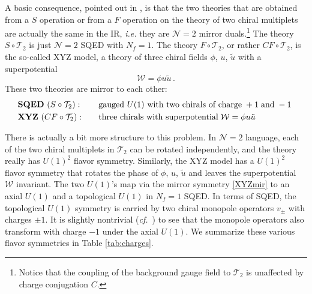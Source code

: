 \documentclass[hyper,letterpaper]{JHEP3}
\numberwithin{equation}{section}
\newcommand{\be}{\begin{equation}}
\newcommand{\ee}{\end{equation}}
\newcommand{\cf}{\emph{cf.}}
\newcommand{\CN}{\mathcal{N}}
\newcommand{\CT}{\mathcal{T}}
\newcommand{\CW}{\mathcal{W}}
\begin{document}
A basic consequence, pointed out in \cite{AHISS, dBHO},
is that the two theories that are obtained from a $S$ operation or from a $F$ operation on the theory
of two chiral multiplets are actually the same in the IR, {\it i.e.} they are $\CN=2$ mirror duals.\footnote{Notice that the coupling of the background gauge field to $\CT_2$ is unaffected by charge conjugation $C$.}
The theory $S \circ \CT_2$ is just $\CN=2$ SQED with $N_f=1$. The theory $F \circ \CT_2$, or rather $CF \circ \CT_2$,  is the so-called XYZ model,
a theory of three chiral fields $\phi$, $u$, $\tilde u$ with a superpotential
\begin{equation}
\CW = \phi u \tilde u \,.
\label{Wuuu}
\end{equation}
These two theories are mirror to each other:
\be
\begin{array}{ll}
\text{\bf SQED}~(S\circ \CT_2): & \quad \text{gauged $U(1)$ with two chirals of charge} \; +1 \; \text{and} \; -1 \;  \\[.1cm]
\text{\bf XYZ}~(CF\circ \CT_2): & \quad \text{three chirals with superpotential} \; \CW = \phi u \tilde u
\end{array} \label{XYZmir}
\ee

There is actually a bit more structure to this problem. In $\CN=2$ language, each of the two chiral multiplets in $\CT_2$
can be rotated independently, and the theory really has $U(1)^2$ flavor symmetry.
Similarly, the XYZ model has a $U(1)^2$ flavor symmetry that rotates the phase of $\phi$, $u$, $\tilde u$ and leaves
the superpotential $\CW$ invariant. The two $U(1)$'s map via the mirror symmetry \eqref{XYZmir} to an axial $U(1)$ and a topological $U(1)$ in $N_f=1$ SQED. In terms of SQED, the topological $U(1)$ symmetry is carried by two chiral monopole operators $v_\pm$ with charges $\pm 1$. It is slightly nontrivial (\cf\ \cite{AHISS}) to see that the monopole operators also transform with charge $-1$ under the axial $U(1)$. We summarize these various flavor symmetries in Table \ref{tab:charges}.
\end{document}
